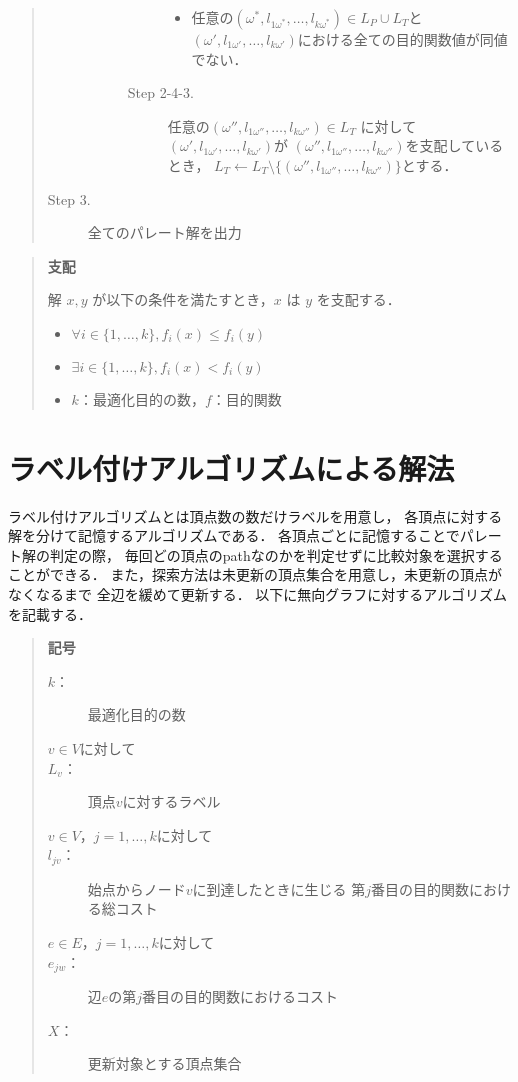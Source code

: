 \documentclass[12pt]{optlab-bachelor}
\begin{document}
\begin{quote}
\begin{description}
\begin{description}
\begin{description}
\begin{itemize}
          \item 任意の$(\omega^*,l_{1\omega^*},\ldots,l_{k\omega^*}) \in L_P \cup L_T$と
          $(\omega',l_{1\omega'},\ldots,l_{k\omega'})$における全ての目的関数値が同値でない．
        \end{itemize}
        \item[Step 2-4-3.] 任意の$(\omega'',l_{1\omega''},\ldots,l_{k\omega''})\in L_T$
        に対して$(\omega',l_{1\omega'},\ldots,l_{k\omega'})$が
        $(\omega'',l_{1\omega''},\ldots,l_{k\omega''})$を支配しているとき，
        $L_T \leftarrow L_T \setminus \{(\omega'',l_{1\omega''},\ldots,l_{k\omega''})\}$とする．
      \end{description}
    \end{description}
    \item[Step 3.] 全てのパレート解を出力
  \end{description}
\end{quote}

\begin{quote}
  \textbf{支配}

    解 $x,y$ が以下の条件を満たすとき，$x$ は $y$ を支配する．
    \begin{itemize}
      \item $\forall i \in \{1,\ldots,k\},f_i(x) \le f_i(y)$
      \item $\exists i \in \{1,\ldots,k\},f_i(x) < f_i(y)$
      \item $k$：最適化目的の数，$f$：目的関数
    \end{itemize}
\end{quote}

\section{ラベル付けアルゴリズムによる解法}
ラベル付けアルゴリズムとは頂点数の数だけラベルを用意し，
各頂点に対する解を分けて記憶するアルゴリズムである．
各頂点ごとに記憶することでパレート解の判定の際，
毎回どの頂点のpathなのかを判定せずに比較対象を選択することができる．
また，探索方法は未更新の頂点集合を用意し，未更新の頂点がなくなるまで
全辺を緩めて更新する．
以下に無向グラフに対するアルゴリズムを記載する．

\begin{quote}
  \textbf{記号}
  \begin{description}
    \item[$k$：] 最適化目的の数
    \item[$v \in V$に対して]
    \item[$L_v$：] 頂点$v$に対するラベル
    \item[$v \in V$，$j = 1 , \ldots , k$に対して]
    \item[$l_{jv}$：] 始点からノード$v$に到達したときに生じる
    第$j$番目の目的関数における総コスト
    \item[$e \in E$，$j = 1 , \ldots , k$に対して]
    \item[$e_{jw}$：] 辺$e$の第$j$番目の目的関数におけるコスト
    \item[$X$：] 更新対象とする頂点集合
  \end{description}
\end{quote}
\end{document}
